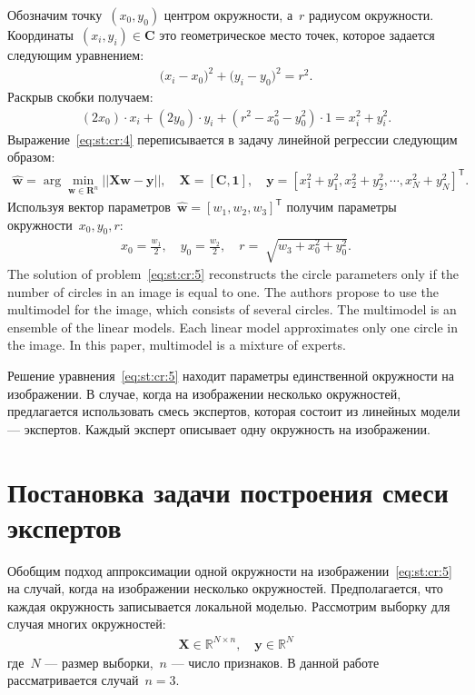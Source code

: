 \documentclass[12pt, twoside]{article}
\numberwithin{equation}{section}
\begin{document}
Обозначим точку~$(x_0, y_0)$ центром окружности, а~$r$ радиусом окружности.
Координаты~$\left(x_i, y_i\right)\in\textbf{C}$ это геометрическое место точек, которое задается следующим уравнением:
\[
\label{eq:st:cr:3}
\begin{aligned}
\bigr(x_i - x_0\bigr)^{2}+\bigr(y_i-y_0\bigr)^2 = r^2.
\end{aligned}
\]
Раскрыв скобки получаем:
\[
\label{eq:st:cr:4}
\begin{aligned}
\left(2x_0\right)\cdot x_i + \left(2y_0\right)\cdot y_i+\left(r^2-x_0^2-y_0^2\right)\cdot1 = x_{i}^2 + y_{i}^2.
\end{aligned}
\]
Выражение~\eqref{eq:st:cr:4} переписывается в задачу линейной регрессии следующим образом:
\[
\label{eq:st:cr:5}
\begin{aligned}
\hat{\textbf{w}} = \arg\min_{\textbf{w}\in \mathbf{R}^{n}}||\textbf{X}\textbf{w} - \textbf{y}||,  \quad \textbf{X} = \left[\textbf{C}, \textbf{1}\right], \quad \textbf{y} = \left[x_1^2+y_1^2, x_2^2+y_2^2, \cdots, x_N^2+y_N^2\right]^{\mathsf{T}}.
\end{aligned}
\]
Используя вектор параметров~$\hat{\textbf{w}} = \left[w_1, w_2, w_3\right]^{\mathsf{T}}$ получим параметры окружности~$x_0, y_0, r$:
\[
\label{eq:st:cr:6}
\begin{aligned}
x_0 = \frac{w_1}{2}, \quad y_0 = \frac{w_2}{2}, \quad r = \sqrt[]{w_3+x_{0}^{2}+y_{0}^{2}}.
\end{aligned}
\]
The solution of problem~\eqref{eq:st:cr:5} reconstructs the circle parameters only if the number of circles in an image is equal to one.
The authors propose to use the multimodel for the image, which consists of several circles.
The multimodel is an ensemble of the linear models.
Each linear model approximates only one circle in the image.
In this paper, multimodel is a mixture of experts.

Решение уравнения~\eqref{eq:st:cr:5} находит параметры единственной окружности на изображении. В случае, когда на изображении несколько окружностей, предлагается использовать смесь экспертов, которая состоит из линейных модели --- экспертов. Каждый эксперт описывает одну окружность на изображении.

\section{Постановка задачи построения смеси экспертов}
Обобщим подход аппроксимации одной окружности на изображении~\eqref{eq:st:cr:5} на случай, когда на изображении несколько окружностей.
Предполагается, что каждая окружность записывается локальной моделью.
Рассмотрим выборку для случая многих окружностей:
\[
\label{eq:st:1}
\begin{aligned}
\textbf{X} \in \mathbb{R}^{N \times n}, \quad \textbf{y}\in \mathbb{R}^{N}
\end{aligned}
\]
где~$N$ --- размер выборки,~$n$ --- число признаков. В данной работе рассматривается случай~$n=3$.
\end{document}
